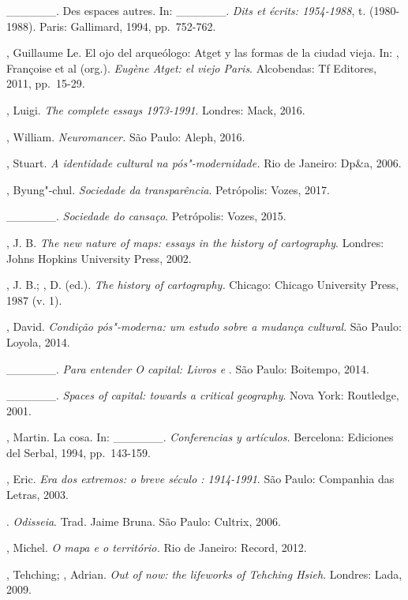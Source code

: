\begin{Parskip}
\_\_\_\_\_\_. Des espaces autres. In: \_\_\_\_\_\_. \emph{Dits
et écrits: 1954-1988}, t.  (1980-1988). Paris: Gallimard, 1994, pp.~752-762.

, Guillaume Le. El ojo del arqueólogo: Atget y las formas de la
ciudad vieja. In: , Françoise et al (org.). \emph{Eugène
Atget: el viejo Paris}. Alcobendas: Tf Editores, 2011, pp.~15-29.

, Luigi. \emph{The complete essays 1973-1991}. Londres: Mack,
2016.

, William. \emph{Neuromancer.} São Paulo: Aleph, 2016.

, Stuart. \emph{A identidade cultural na pós"-modernidade.} Rio de
Janeiro: Dp\&a, 2006.

, Byung"-chul. \emph{Sociedade da transparência}. Petrópolis: Vozes, 2017.

\_\_\_\_\_\_. \emph{Sociedade do cansaço}. Petrópolis: Vozes, 2015.

, J. B. \emph{The new nature of maps: essays in the history of
cartography}. Londres: Johns Hopkins University Press, 2002.

, J. B.; , D. (ed.). \emph{The history of cartography.}
Chicago: Chicago University Press, 1987 (v. 1).

, David. \emph{Condição pós"-moderna: um estudo sobre a mudança
cultural}. São Paulo: Loyola, 2014.

\_\_\_\_\_\_. \emph{Para entender \emph{O capital}: Livros  e
}. São Paulo: Boitempo, 2014.

\_\_\_\_\_\_. \emph{Spaces of capital: towards a critical
geography}. Nova York: Routledge, 2001.

, Martin. La cosa. In: \_\_\_\_\_\_. \emph{Conferencias y
artículos.} Bercelona: Ediciones del Serbal, 1994, pp.~143-159.

, Eric. \emph{Era dos extremos: o breve século : 1914-1991}.
São Paulo: Companhia das Letras, 2003.

. \emph{Odisseia}. Trad. Jaime Bruna. São Paulo: Cultrix, 2006.

, Michel. \emph{O mapa e o território.} Rio de Janeiro:
Record, 2012.

, Tehching; , Adrian. \emph{Out of now: the lifeworks
of Tehching Hsieh}. Londres: Lada, 2009.


\end{Parskip}
